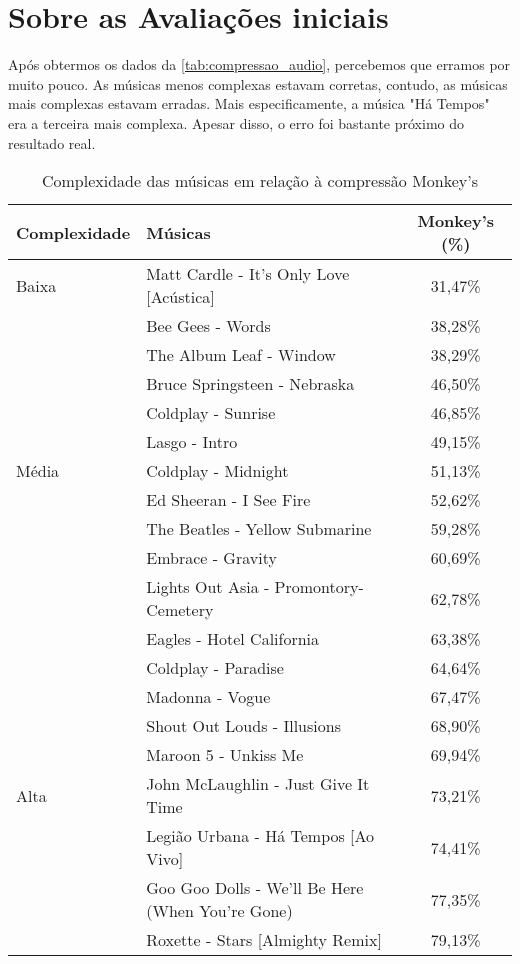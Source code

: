 \section{Sobre as Avaliações iniciais}
Após obtermos os dados da \ref{tab:compressao_audio}, percebemos que erramos por muito pouco. As músicas menos complexas estavam corretas, contudo, as músicas mais complexas estavam erradas. Mais especificamente, a música "Há Tempos" era a terceira mais complexa. Apesar disso, o erro foi bastante próximo do resultado real.

\begin{table}[htbp]
\centering
\caption{Complexidade das músicas em relação à compressão Monkey's}
\begin{tabularx}{\textwidth}{l|X|c}
\toprule
\textbf{Complexidade} & \textbf{Músicas} & \textbf{Monkey's (\%)} \\
\midrule
Baixa & Matt Cardle - It’s Only Love [Acústica] & 31,47\% \\
      & Bee Gees - Words                         & 38,28\% \\
      & The Album Leaf - Window                 & 38,29\% \\
      & Bruce Springsteen - Nebraska            & 46,50\% \\
      & Coldplay - Sunrise                      & 46,85\% \\
      & Lasgo - Intro                           & 49,15\% \\
\midrule
Média & Coldplay - Midnight                     & 51,13\% \\
      & Ed Sheeran - I See Fire                & 52,62\% \\
      & The Beatles - Yellow Submarine          & 59,28\% \\
      & Embrace - Gravity                       & 60,69\% \\
      & Lights Out Asia - Promontory-Cemetery   & 62,78\% \\
      & Eagles - Hotel California              & 63,38\% \\
      & Coldplay - Paradise                    & 64,64\% \\
      & Madonna - Vogue                        & 67,47\% \\
      & Shout Out Louds - Illusions            & 68,90\% \\
      & Maroon 5 - Unkiss Me                   & 69,94\% \\
\midrule
Alta  & John McLaughlin - Just Give It Time    & 73,21\% \\
      & Legião Urbana - Há Tempos [Ao Vivo]    & 74,41\% \\
      & Goo Goo Dolls - We'll Be Here (When You're Gone) & 77,35\% \\
      & Roxette - Stars [Almighty Remix]       & 79,13\% \\
\bottomrule
\end{tabularx}
\end{table}